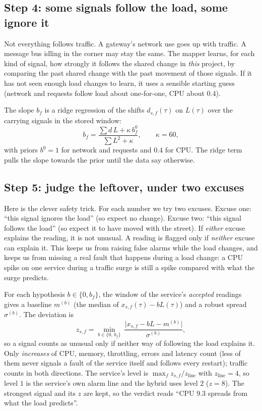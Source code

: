 \subsection{Step 4: some signals follow the load, some ignore it}
\begin{simplebox}
Not everything follows traffic. A gateway's network use goes up with traffic. A message bus idling in the corner may stay the same. The mapper learns, for each kind of signal, how strongly it follows the shared change in \emph{this} project, by comparing the past shared change with the past movement of those signals. If it has not seen enough load changes to learn, it uses a sensible starting guess (network and requests follow load about one-for-one, CPU about 0.4).
\end{simplebox}

\begin{techbox}
The slope $b_f$ is a ridge regression of the shifts $d_{s,f}(\tau)$ on $L(\tau)$ over the carrying signals in the stored window:
\[
b_f=\frac{\sum d\,L+\kappa\,b^0_f}{\sum L^2+\kappa},\qquad \kappa=60,
\]
with priors $b^0=1$ for network and requests and $0.4$ for CPU. The ridge term pulls the slope towards the prior until the data say otherwise.
\end{techbox}

\subsection{Step 5: judge the leftover, under two excuses}
\begin{simplebox}
Here is the clever safety trick. For each number we try two excuses. Excuse one: ``this signal ignores the load'' (so expect no change). Excuse two: ``this signal follows the load'' (so expect it to have moved with the street). If \emph{either} excuse explains the reading, it is not unusual. A reading is flagged only if \emph{neither} excuse can explain it. This keeps us from raising false alarms while the load changes, and keeps us from missing a real fault that happens during a load change: a CPU spike on one service during a traffic surge is still a spike compared with what the surge predicts.
\end{simplebox}

\begin{techbox}
For each hypothesis $b\in\{0,b_f\}$, the window of the service's \emph{accepted} readings gives a baseline $m^{(b)}$ (the median of $x_{s,f}(\tau)-bL(\tau)$) and a robust spread $\sigma^{(b)}$. The deviation is
\[
z_{s,f}=\min_{b\in\{0,\,b_f\}}\ \frac{\lvert x_{s,f}-bL-m^{(b)}\rvert}{\sigma^{(b)}},
\]
so a signal counts as unusual only if neither way of following the load explains it. Only \emph{increases} of CPU, memory, throttling, errors and latency count (less of them never signals a fault of the service itself and follows every restart); traffic counts in both directions. The service's level is $\max_f z_{s,f}/z_{\text{line}}$ with $z_{\text{line}}=4$, so level $1$ is the service's own alarm line and the hybrid uses level $2$ ($z=8$). The strongest signal and its $z$ are kept, so the verdict reads ``CPU 9.3 spreads from what the load predicts''.
\end{techbox}

